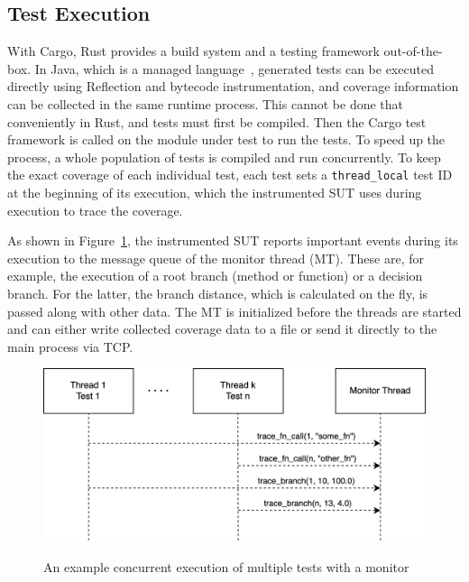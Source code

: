 \documentclass{article}
\begin{document}
\subsection{Test Execution}
With Cargo, Rust provides a build system and a testing framework out-of-the-box. In Java, which is a managed language~\cite{Gough2005}, generated tests can be executed directly using Reflection and bytecode instrumentation, and coverage information can be collected in the same runtime process. This cannot be done that conveniently in Rust, and tests must first be compiled. Then the Cargo test framework is called on the module under test to run the tests. To speed up the process, a whole population of tests is compiled and run concurrently. To keep the exact coverage of each individual test, each test sets a \lstinline{thread_local} test ID at the beginning of its execution, which the instrumented \ac{SUT} uses during execution to trace the coverage.

As shown in Figure~\ref{fig:test-execution}, the instrumented \ac{SUT} reports important events during its execution to the message queue of the monitor thread (MT). These are, for example, the execution of a root branch (method or function) or a decision branch. For the latter, the branch distance, which is calculated on the fly, is passed along with other data. The MT is initialized before the threads are started and can either write collected coverage data to a file or send it directly to the main process via TCP.

\begin{figure}[h]
\caption{An example concurrent execution of multiple tests with a monitor}
\centering
\includegraphics[width=\textwidth]{test-execution}
\label{fig:test-execution}
\end{figure}
\end{document}
